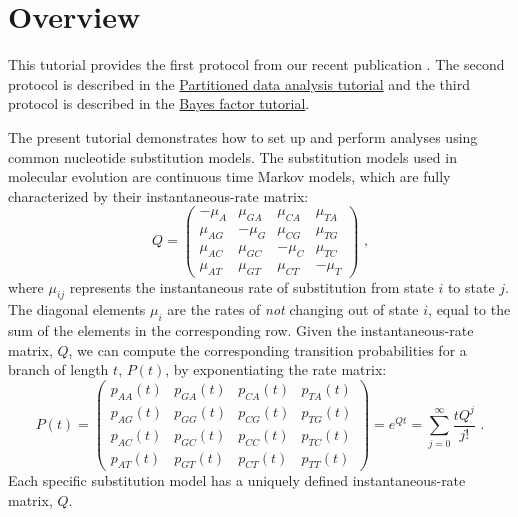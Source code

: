 \section{Overview}

This tutorial provides the first protocol from our recent publication \citep{Hoehna2017a}.
The second protocol is described in the \href{https://github.com/revbayes/revbayes_tutorial/raw/master/tutorial_TeX/RB_Partition_Tutorial/RB_Partition_Tutorial.pdf}{Partitioned data analysis tutorial} and the third protocol is described in the \href{https://github.com/revbayes/revbayes_tutorial/raw/master/tutorial_TeX/RB_BayesFactor_Tutorial/RB_BayesFactor_Tutorial.pdf}{Bayes factor tutorial}.

The present tutorial demonstrates how to set up and perform analyses using common nucleotide substitution models. 
The substitution models used in molecular evolution are continuous time Markov models, which are fully characterized by their instantaneous-rate matrix:
\begin{equation*}
Q = \begin{pmatrix} -\mu_A & \mu_{GA} & \mu_{CA} & \mu_{TA} \\
\mu_{AG} & -\mu_G  & \mu_{CG} & \mu_{TG} \\
\mu_{AC} & \mu_{GC} & -\mu_C  & \mu_{TC} \\
\mu_{AT} & \mu_{GT} & \mu_{CT} & -\mu_T 
\end{pmatrix} \mbox{  ,}
\end{equation*}
where $\mu_{ij}$ represents the instantaneous rate of substitution from state $i$ to state $j$.
The diagonal elements $\mu_i$ are the rates of \emph{not} changing out of state $i$, equal to the sum of the elements in the corresponding row.
Given the instantaneous-rate matrix, $Q$, we can compute the corresponding transition probabilities for a branch of length $t$, $P(t)$, by exponentiating the rate matrix:
\begin{equation*}
P(t) = \begin{pmatrix}          
p_{AA}(t) & p_{GA}(t) & p_{CA}(t) & p_{TA}(t) \\
p_{AG}(t) & p_{GG}(t) & p_{CG}(t) & p_{TG}(t) \\
p_{AC}(t) & p_{GC}(t) & p_{CC}(t) & p_{TC}(t) \\
p_{AT}(t) & p_{GT}(t) & p_{CT}(t) & p_{TT}(t)
\end{pmatrix} = e^{Qt} = \sum_{j=0}^\infty\frac{tQ^j}{j!} \mbox{  .}
\end{equation*}
Each specific substitution model has a uniquely defined instantaneous-rate matrix, $Q$.


